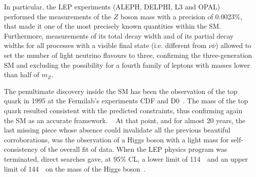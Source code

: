 In particular, the LEP experiments (ALEPH, DELPHI, L3 and OPAL) performed the measurements 
of the $Z$ boson mass with a precision of 0.0023\%, that made it one of the most 
precisely known quantities within the SM. %
Furthermore, measurements of its total 
decay width and of its partial decay widths for all processes with a 
visible final state (i.e. different from $\nu\bar\nu$) allowed to set 
the number of light neutrino flavours to three, confirming the three-generation 
SM and excluding the possibility for a fourth family of leptons with masses
 lower than half of $m_Z$.

The penultimate discovery inside the SM has been the observation of the 
top quark in 1995 at the Fermilab's experiments CDF and 
D0~\cite{PhysRevLett.74.2626,PhysRevLett.74.2422}. 
The mass of the top quark resulted consistent with the predicted 
constraints, thus confirming again the SM as an accurate framework. 
~\cite{Wicke:2010cg}
At that point, and for almost 20 years, the last missing piece whose
absence could invalidate all the previous beautiful corroborations, was
the observation of a Higgs boson with a light mass for  self-consistency 
of the overall fit of data. When the LEP physics program was terminated,
direct searches gave, at 95\% CL, a lower limit of 114~\gev\ and an upper 
limit of 144~\gev\ on the mass of the Higgs boson~\cite{Renton}.

